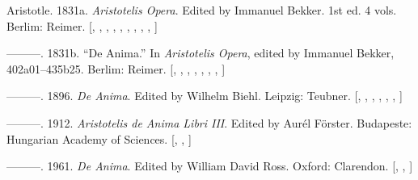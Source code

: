 \documentclass[
  12pt,
  a4paper,
  oneside]{scrbook}
\newlength{\cslhangindent}
\newlength{\cslentryspacingunit} %
\newenvironment{CSLReferences}[2] %
 {%
  \setlength{\parindent}{0pt}
  \ifodd #1
  \let\oldpar\par
  \def\par{\hangindent=\cslhangindent\oldpar}
  \fi
  \setlength{\parskip}{#2\cslentryspacingunit}
 }%
 {}
\begin{document}
\hypertarget{refs_multibib33}{}
\begin{CSLReferences}{1}{0}
\leavevmode{}%
Aristotle. 1831a. \emph{Aristotelis Opera}. Edited by Immanuel Bekker.
1st ed. 4 vols. Berlim: Reimer.
{[},
\protect\hyperlink{cite_37}{\pageref{cite_37}},
\protect\hyperlink{cite_38}{\pageref{cite_38}},
\protect\hyperlink{cite_39}{\pageref{cite_39}},
\protect\hyperlink{cite_47}{\pageref{cite_47}},
\protect\hyperlink{cite_48}{\pageref{cite_48}},
\protect\hyperlink{cite_49}{\pageref{cite_49}},
\protect\hyperlink{cite_57}{\pageref{cite_57}},
\protect\hyperlink{cite_58}{\pageref{cite_58}},
\protect\hyperlink{cite_59}{\pageref{cite_59}}{]}

\leavevmode{}%
---------. 1831b. {``De Anima.''} In \emph{Aristotelis Opera}, edited by
Immanuel Bekker, 402a01--435b25. Berlim: Reimer.
{[},
\protect\hyperlink{cite_40}{\pageref{cite_40}},
\protect\hyperlink{cite_41}{\pageref{cite_41}},
\protect\hyperlink{cite_42}{\pageref{cite_42}},
\protect\hyperlink{cite_50}{\pageref{cite_50}},
\protect\hyperlink{cite_51}{\pageref{cite_51}},
\protect\hyperlink{cite_52}{\pageref{cite_52}},
\protect\hyperlink{cite_60}{\pageref{cite_60}}{]}

\leavevmode{}%
---------. 1896. \emph{De Anima}. Edited by Wilhelm Biehl. Leipzig:
Teubner. {[},
\protect\hyperlink{cite_43}{\pageref{cite_43}},
\protect\hyperlink{cite_44}{\pageref{cite_44}},
\protect\hyperlink{cite_53}{\pageref{cite_53}},
\protect\hyperlink{cite_54}{\pageref{cite_54}},
\protect\hyperlink{cite_61}{\pageref{cite_61}},
\protect\hyperlink{cite_62}{\pageref{cite_62}}{]}

\leavevmode{}%
---------. 1912. \emph{Aristotelis de Anima Libri III}. Edited by Aurél
Förster. Budapeste: Hungarian Academy of Sciences.
{[},
\protect\hyperlink{cite_65}{\pageref{cite_65}},
\protect\hyperlink{cite_66}{\pageref{cite_66}}{]}

\leavevmode{}%
---------. 1961. \emph{De Anima}. Edited by William David Ross. Oxford:
Clarendon. {[},
\protect\hyperlink{cite_69}{\pageref{cite_69}},
\protect\hyperlink{cite_70}{\pageref{cite_70}}{]}

\end{CSLReferences}
\end{document}
